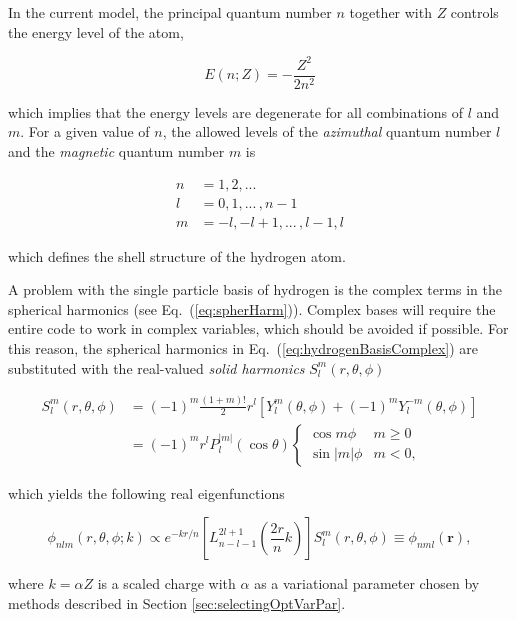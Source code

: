 In the current model, the principal quantum number $n$ together with $Z$ controls the energy level of the atom, 

\begin{equation}
 E(n; Z) = -\frac{Z^2}{2n^2}\label{eq:AtomNonIntEnergy}
\end{equation}

which implies that the energy levels are degenerate for all combinations of $l$ and $m$. For a given value of $n$, the allowed levels of the \textit{azimuthal} quantum number $l$ and the \textit{magnetic} quantum number $m$ is 

\begin{align*}
 n &= 1, 2, ... \\
 l &= 0, 1, ...\,, n-1 \\
 m &= -l, -l + 1, ...\,, l - 1, l
\end{align*}


which defines the shell structure of the hydrogen atom. 

A problem with the single particle basis of hydrogen is the complex terms in the spherical harmonics (see Eq.~(\ref{eq:spherHarm})). Complex bases will require the entire code to work in complex variables, which should be avoided if possible. For this reason, the spherical harmonics in Eq.~(\ref{eq:hydrogenBasisComplex}) are substituted with the real-valued \textit{solid harmonics} $S_l^m(r, \theta, \phi)$ \cite{SolidHarmonics}

\begin{align}
S_l^m(r, \theta, \phi) &= (-1)^m\frac{(1+m)!}{2}r^l\left[Y_l^m(\theta, \phi) + (-1)^m Y_l^{-m}(\theta, \phi)\right] \\
 &= (-1)^m r^{l} P_l^{|m|}(\cos\theta) \begin{cases} \cos m\phi & m \ge 0 \\ \sin|m|\phi &  m < 0, \end{cases}                                                                                                             
\end{align}

which yields the following real eigenfunctions

\begin{equation}
  \phi_{nlm}(r, \theta, \phi; k) \propto e^{-kr/n}\left[L_{n-l-1}^{2l+1}\left(\frac{2r}{n}k\right)\right] S_l^m(r, \theta, \phi) \equiv \phi_{nml}(\mathbf{r}), \label{eq:hydrogenBasisReal}
\end{equation}

where $k = \alpha Z$ is a scaled charge with $\alpha$ as a variational parameter chosen by methods described in Section \ref{sec:selectingOptVarPar}.

